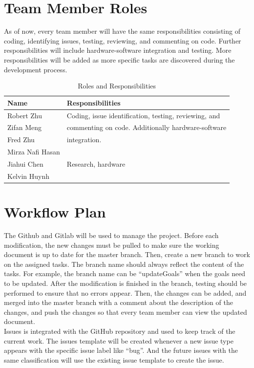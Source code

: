 \documentclass{article}
\begin{document}
\section{Team Member Roles}

As of now, every team member will have the same responsibilities consisting of coding,
identifying issues, testing, reviewing, and commenting on code. Further responsibilities
will include hardware-software integration and testing. More responsibilities will be
added as more specific tasks are discovered during the development process.

\begin{table}[H]
\caption{Roles and Responsibilities} \label{TblRoles}
\begin{tabularx}{\textwidth}{ll}
\toprule
\textbf{Name} & \textbf{Responsibilities}\\
\midrule
Robert Zhu & Coding, issue identification, testing, reviewing, and \\
Zifan Meng & commenting on code. Additionally hardware-software \\
Fred Zhu & integration. \\
Mirza Nafi Hasan & \\
Jiahui Chen & Research, hardware\\
Kelvin Huynh & \\
\bottomrule
\end{tabularx}
\end{table}

\section{Workflow Plan}

The Github and Gitlab will be used to manage the project. Before each modification, the new changes
must be pulled to make sure the working document is up to date for the master branch. Then, create
a new branch to work on the assigned tasks. The branch name should always reflect the content of the
tasks. For example, the branch name can be “updateGoals” when the goals need to be updated. After
the modification is finished in the branch, testing should be performed to ensure that no errors appear.
Then, the changes can be added, and merged into the master branch with a comment about the description
of the changes, and push the changes so that every team member can view the updated document.\\ Issues is
integrated with the GitHub repository and used to keep track of the current work. The issues template will
be created whenever a new issue type appears with the specific issue label like “bug”. And the future
issues with the same classification will use the existing issue template to create the issue.
\end{document}
